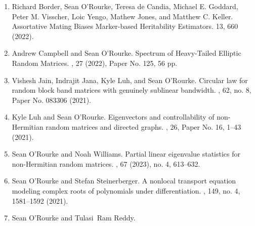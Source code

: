 \documentclass[letterpaper]{article}
\begin{document}
\begin{enumerate}
	\item Richard Border, Sean O'Rourke, Teresa de Candia, Michael E. Goddard, Peter M. Visscher, Loic Yengo, Mathew Jones, and Matthew C. Keller. 
	\newblock Assortative Mating Biases Marker-based Heritability Estimators.
	 13, 660 (2022). 
	
	\item Andrew Campbell and Sean O'Rourke.
	\newblock Spectrum of Heavy-Tailed Elliptic Random Matrices.  
	, 27 (2022), Paper No. 125, 56 pp. 
	
	\item Vishesh Jain, Indrajit Jana, Kyle Luh, and Sean O'Rourke.
	\newblock Circular law for random block band matrices with genuinely sublinear bandwidth.
	, 62, no. 8, Paper No. 083306 (2021). 
	\item Kyle Luh and Sean O'Rourke.
	\newblock Eigenvectors and controllability of non-Hermitian random matrices and directed graphs.
	, 26, Paper No. 16, 1--43 (2021). 
	\item Sean O'Rourke and Noah Williams.
	\newblock Partial linear eigenvalue statistics for non-Hermitian random matrices.
	, 67 (2023), no. 4, 613--632. 
	\item Sean O'Rourke and Stefan Steinerberger.
	\newblock A nonlocal transport equation modeling complex roots of polynomials under differentiation.
	, 149, no. 4, 1581--1592 (2021).   
	\item Sean O'Rourke and Tulasi~Ram Reddy.

\end{enumerate}
\end{document}
